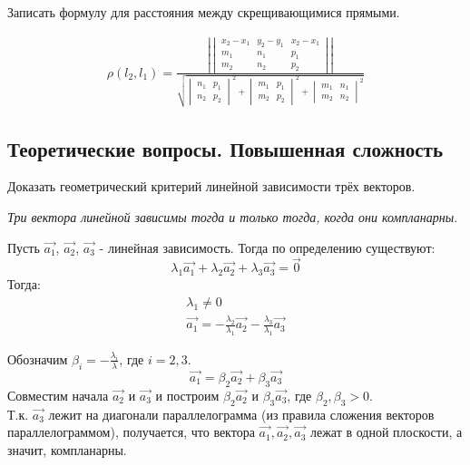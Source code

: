\begin{question}
  Записать формулу для расстояния между скрещивающимися прямыми. 
\end{question}
\begin{answer}
  \begin{gather*}
    \rho(l_2, l_1) = 
    \frac{
      \left|
      \begin{vmatrix}
        x_2 - x_1 & y_2 - y_1 & x_2 - x_1 \\
        m_1 & n_1 & p_1 \\
        m_2 & n_2 & p_2
      \end{vmatrix}
    \right| 
    }{
      \sqrt{
        \begin{vmatrix}
          n_1 & p_1 \\
          n_2 & p_2
        \end{vmatrix}^2 +
        \begin{vmatrix}
          m_1 & p_1 \\
          m_2 & p_2
        \end{vmatrix}^2 +  
        \begin{vmatrix}
          m_1 & n_1 \\
          m_2 & n_2
        \end{vmatrix}^2 
      }
    }
  \end{gather*}
\end{answer}

\subsection{Теоретические вопросы. Повышенная сложность}

\begin{question}
  Доказать геометрический критерий линейной зависимости трёх векторов.
\end{question}
\begin{answer}
  \begin{center}
  \textit{Три вектора линейной зависимы тогда и только тогда, когда они компланарны}. \\
  \end{center}
  Пусть $\vec{a_1}$, $\vec{a_2}$, $\vec{a_3}$ - линейная зависимость.
  Тогда по определению существуют:
  \[
    \lambda_1 \vec{a_1} + \lambda_2 \vec{a_2} + \lambda_3 \vec{a_3} = \vec{0}
  \] 
  Тогда:
  \begin{gather*}
    \lambda_1 \neq 0 \\
    \vec{a_1} = -\frac{\lambda_2}{\lambda_1} \vec{a_2} - \frac{\lambda_3}{\lambda_1} \vec{a_3}
  \end{gather*}

  Обозначим $\beta_i = -\frac{\lambda_i}{\lambda}$, где $i = 2, 3$. \\
  \[
    \vec{a_1} = \beta_2 \vec{a_2} + \beta_3 \vec{a_3}
  \]
  Совместим начала $\vec{a_2}$ и $\vec{a_3}$ и построим $\beta_2 \vec{a_2}$ и $\beta_3 \vec{a_3}$, где $\beta_2, \beta_3 > 0$. \\
  Т.к. $\vec{a_3}$ лежит на диагонали параллелограмма (из правила сложения векторов параллелограммом), получается, что вектора $\vec{a_1}, \vec{a_2}, \vec{a_3}$ лежат в одной плоскости, а значит, компланарны.
\end{answer}

